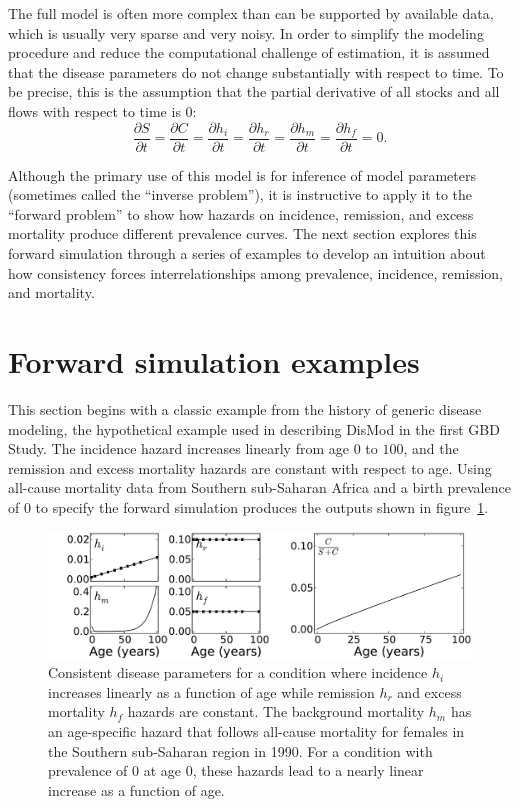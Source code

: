 The full model is often more complex than can be supported by
available data, which is usually very sparse and very noisy.  In order
to simplify the modeling procedure and reduce the computational challenge
of estimation, it is assumed that the disease parameters do not change
substantially with respect to time. To be precise, this is the assumption
that the partial derivative of all stocks and all flows with respect
to time is $0$:
\[
\frac{\partial S}{\partial t}
=
\frac{\partial C}{\partial t}
=
\frac{\partial h_i}{\partial t}
=
\frac{\partial h_r}{\partial t}
=
\frac{\partial h_m}{\partial t}
=
\frac{\partial h_f}{\partial t}
=
0.
\]

Although the primary use of this model is for inference of model
parameters (sometimes called the ``inverse problem''), it is
instructive to apply it to the ``forward problem'' to show how hazards on incidence,
remission, and excess mortality produce different prevalence
curves. The next section explores this forward simulation through a
series of examples to develop an intuition about how consistency
forces interrelationships among prevalence, incidence, remission,
and mortality.


\section{Forward simulation examples}

This section begins with a classic example from the history of generic
disease modeling, the hypothetical example used in describing DisMod
in the first GBD Study.\cite{murray_global_1996}
The incidence hazard increases linearly from age $0$ to
$100$, and the remission and excess mortality hazards are constant with
respect to age.  Using all-cause mortality data from Southern sub-Saharan
Africa and a birth prevalence of $0$ to specify
the forward simulation produces the outputs shown in
figure~\ref{forward-sim-ex1}.

\begin{figure}[htb]
\begin{center}
\includegraphics[width=\textwidth]{initial.pdf}
\caption[Consistent disease parameters for a condition.]{Consistent 
  disease parameters for a condition where incidence
  $h_i$ increases linearly as a function of age while remission
  $h_r$ and excess mortality $h_f$ hazards are constant. The
  background mortality $h_m$ has an age-specific hazard that follows
  all-cause mortality for females in the Southern sub-Saharan region
  in 1990. For a condition with prevalence of $0$ at age $0$, these
  hazards lead to a nearly linear increase as a function of age.}
\label{forward-sim-ex1}
\end{center}
\end{figure}

